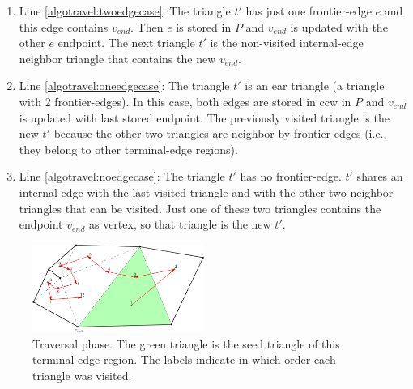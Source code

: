 \documentclass[lineno,pdflatex,sn-mathphys]{sn-jnl}%
\theoremstyle{thmstyleone}%
\theoremstyle{thmstyletwo}%
\theoremstyle{thmstylethree}%
\begin{document}
\begin{enumerate}[label=\roman*)]
    \item Line \ref{algotravel:twoedgecase}: The triangle $t'$ has just  one frontier-edge $e$ and this edge contains $v_{end}$. Then $e$ is stored in $P$ and $v_{end}$ is updated with the other $e$ endpoint. The next triangle $t'$ is the non-visited internal-edge neighbor triangle that contains the new $v_{end}$. %
    
    \item Line \ref{algotravel:oneedgecase}: The triangle $t'$ is an ear triangle (a triangle with 2 frontier-edges). In this case, both edges are stored in ccw in $P$ and $v_{end}$ is updated with last stored endpoint. The previously visited triangle is the new $t'$ because the other two triangles are neighbor by frontier-edges (i.e., they belong to other terminal-edge regions).
    
    \item Line \ref{algotravel:noedgecase}: The triangle $t'$ has no frontier-edge. $t'$ shares an internal-edge with the last visited triangle and with the other two neighbor triangles that can be visited. Just one of these two triangles contains the endpoint $v_{end}$ as vertex, so that triangle is the new $t'$. 
\end{enumerate}


\begin{figure}[h]
    \centering
\includegraphics[width=0.5\textwidth]{travelphase4}

    \caption{Traversal phase. The green triangle is the seed triangle of this terminal-edge region. The labels indicate in which order  each triangle was visited. } 
    \label{fig:travelphase}
\end{figure}
\end{document}
